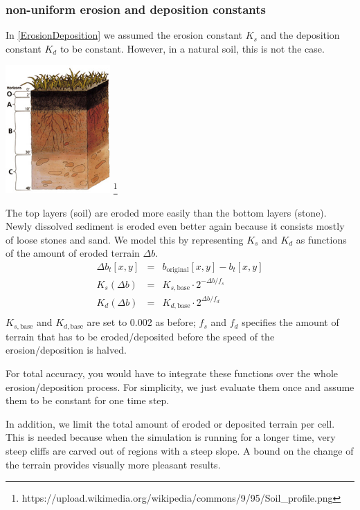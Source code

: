 \documentclass[journal, letterpaper]{IEEEtran}
\begin{document}
\subsubsection{non-uniform erosion and deposition constants}
In \ref{ErosionDeposition} we assumed the erosion constant $K_s$ and the deposition constant $K_d$ to be constant.
However, in a natural soil, this is not the case.
\begin{center}
	\includegraphics[width=0.3\textwidth]{images/Soil_profile}
	\footnote{https://upload.wikimedia.org/wikipedia/commons/9/95/Soil\_profile.png}
\end{center}
The top layers (soil) are eroded more easily than the bottom layers (stone). Newly dissolved sediment is eroded even better again because it consists mostly of loose stones and sand.
We model this by representing $K_s$ and $K_d$ as functions of the amount of eroded terrain $\Delta b$.
\begin{equation}
\begin{array}{rcl}
	\Delta b_t[x,y] &=& b_\text{original}[x,y] - b_t[x,y] \\
	K_s(\Delta b) &=& K_{s,\text{base}} \cdot 2^{-\Delta b / f_s} \\
	K_d(\Delta b) &=& K_{d,\text{base}} \cdot 2^{\Delta b / f_d} \\
\end{array}
\label{eq:KsKd}
\end{equation}
$K_{s,\text{base}}$ and $K_{d,\text{base}}$ are set to 0.002 as before; $f_s$ and $f_d$ specifies the amount of terrain that has to be eroded/deposited before the speed of the erosion/deposition is halved.

For total accuracy, you would have to integrate these functions over the whole erosion/deposition process. For simplicity, we just evaluate them once and assume them to be constant for one time step.

In addition, we limit the total amount of eroded or deposited terrain per cell. This is needed because when the simulation is running for a longer time, very steep cliffs are carved out of regions with a steep slope. A bound on the change of the terrain provides visually more pleasant results.
\end{document}
